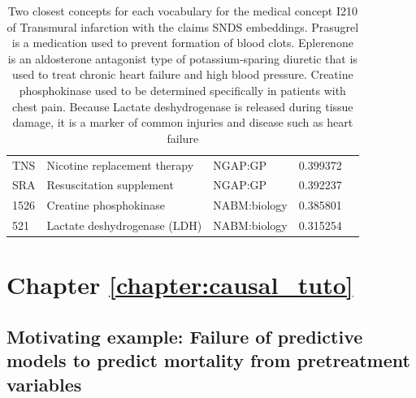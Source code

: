 \documentclass[french,12pt,twoside,a4paper]{book}
\begin{document}
\begin{appendices}
\begin{table}
{\begin{tabular}{llllr}
        TNS          & Nicotine replacement therapy                                                                           & NGAP:GP         & 0.399372 \\
        SRA          & Resuscitation supplement                                                                               & NGAP:GP         & 0.392237 \\
        1526         & Creatine phosphokinase                                                                                 & NABM:biology    & 0.385801 \\
        521          & Lactate deshydrogenase (LDH)                                                                           & NABM:biology
                     & 0.315254                                                                                                                            \\
        \bottomrule
      \end{tabular}
    }
    \caption{Two closest concepts for each vocabulary for the medical concept I210
      of Transmural infarction with the claims SNDS embeddings. Prasugrel is a
      medication used to prevent formation of blood clots. Eplerenone is an
      aldosterone antagonist type of potassium-sparing diuretic that is used to
      treat chronic heart failure and high blood pressure. Creatine phosphokinase
      used to be determined specifically in patients with chest pain. Because
      Lactate deshydrogenase is released during tissue damage, it is a
      marker of common injuries and disease such as heart failure}%
    \label{table:embedding_nn}
  \end{table}



  \chapter{Chapter \ref{chapter:causal_tuto}}\label{apd:causal_tuto}

  \section{Motivating example: Failure of predictive models to predict mortality
    from pretreatment variables}%
  \label{apd:motivating_example}%


\end{appendices}
\end{document}
